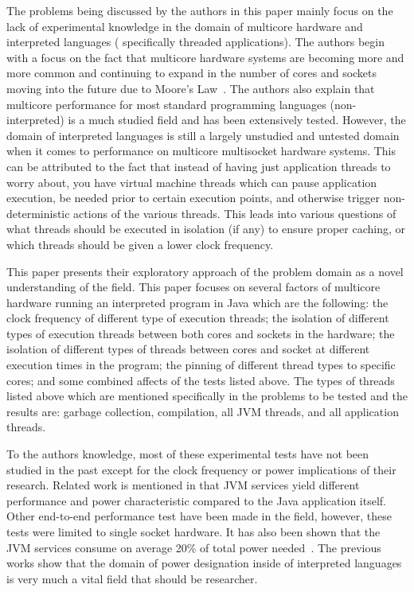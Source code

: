 \documentclass[conference]{IEEEtran}
\begin{document}
The problems being discussed by the authors in this paper mainly focus on the lack of 
experimental knowledge in the domain of multicore hardware and interpreted languages (
specifically threaded applications).
The authors begin with a focus on the fact that multicore hardware systems are becoming
more and more common and continuing to expand in the number of cores and sockets moving
into the future due to Moore's Law~\cite{Moore:2000:CMC}. The authors also explain that multicore performance
for most standard programming languages (non-interpreted) is a much studied field and
has been extensively tested. However, the domain of interpreted languages is still a largely
unstudied and untested domain when it comes to performance on multicore multisocket hardware
systems. This can be attributed to the fact that instead of having just application threads to
worry about, you have virtual machine threads which can pause application execution, be needed
prior to certain execution points, and otherwise trigger non-deterministic actions of the various threads.
This leads into various questions of what threads should be executed in isolation (if any) to
ensure proper caching, or which threads should be given a lower clock frequency.

This paper presents their exploratory approach of the problem domain as a novel understanding of 
the field. This paper focuses on several factors of multicore hardware running an interpreted
program in Java which are the following: the clock frequency of different type of execution threads; 
the isolation of different types of execution threads between both cores and sockets in the 
hardware; the isolation of different types of threads between cores and socket at different
execution times in the program; the pinning of different thread types to specific cores; and some
combined affects of the tests listed above. The types of threads listed above which are mentioned
specifically in the problems to be tested and the results are: garbage collection, compilation, 
all JVM threads, and all application threads.

To the authors knowledge, most of these experimental tests have not been studied in the past
except for the clock frequency or power implications of their research. Related work is mentioned
in that JVM services yield different performance and power characteristic compared to the Java
application itself. Other end-to-end performance test have been made in the field, however,
these tests were limited to single socket hardware. It has also been shown that the JVM
services consume on average 20\% of total power needed~\cite{Cao:2012:YYP}. The previous works show that the
domain of power designation inside of interpreted languages is very much a vital field
that should be researcher. 
\end{document}
